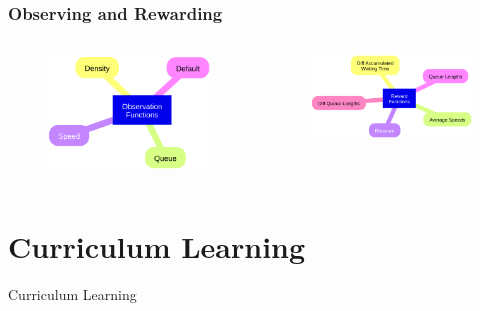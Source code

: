 \documentclass[dvipsnames]{beamer}
\begin{document}
\begin{frame}
\frametitle{Observing and Rewarding}
  \begin{columns}
  \begin{column}{0.4\textwidth}
    \begin{figure}
      \centering
      \includegraphics[width=1.0\textwidth]{figures/sumo-rf-observations.png}
    \end{figure}
  \end{column}
  \begin{column}{0.6\textwidth}
    \begin{figure}
      \centering
      \includegraphics[width=1.0\textwidth]{figures/sumo-rf-rewards.png}
    \end{figure}
  \end{column}
\end{columns}
\end{frame}

\section{Curriculum Learning}
\begin{frame}
\centering
\Huge
Curriculum Learning
\end{frame}
\end{document}
